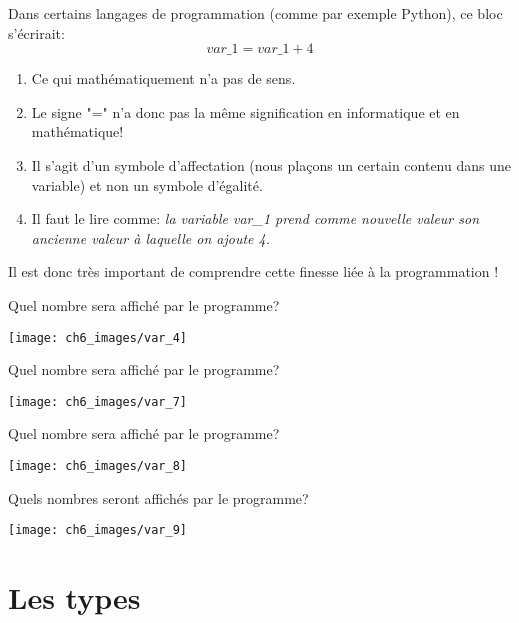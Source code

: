 \documentclass[11pt, a4paper]{book}
\begin{document}
\begin{remarque}
Dans certains langages de programmation (comme par exemple Python), ce bloc s'écrirait:
$$var\_1=var\_1+4$$

\begin{enumerate}
\item Ce qui mathématiquement n'a pas de sens.
\item Le signe "=" n'a donc pas la même signification en informatique et en mathématique!
\item Il s’agit d’un symbole d’affectation (nous plaçons un certain contenu dans une variable) et non un symbole d’égalité.
\item Il faut le lire comme: {\it la variable var\_1 prend comme nouvelle valeur son ancienne valeur à laquelle on ajoute 4.} 
\end{enumerate}
\end{remarque}

Il est donc très important de comprendre cette finesse liée à la programmation !

\begin{exercice}
Quel nombre sera affiché par le programme?
\begin{center}
\texttt{[image: ch6\_images/var\_4]}
\end{center}
\end{exercice}

\begin{exercice}
Quel nombre sera affiché par le programme?
\begin{center}
\texttt{[image: ch6\_images/var\_7]}
\end{center}
\end{exercice}

\begin{exercice}
Quel nombre sera affiché par le programme?
\begin{center}
\texttt{[image: ch6\_images/var\_8]}
\end{center}
\end{exercice}

\newpage

\begin{exercice}
Quels nombres seront affichés par le programme?
\begin{center}
\texttt{[image: ch6\_images/var\_9]}
\end{center}
\end{exercice}


\section{Les types}
\end{document}
